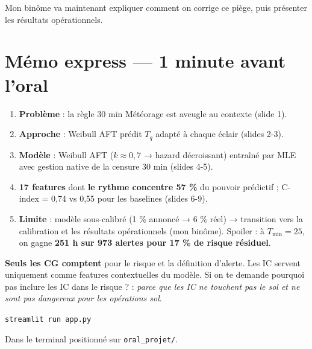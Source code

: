 \documentclass[11pt,a4paper]{article}
\begin{document}
\begin{transit}
\og Mon binôme va maintenant expliquer comment on corrige ce piège, puis présenter les
résultats opérationnels. \fg{}
\end{transit}

\section*{Mémo express — 1 minute avant l'oral}

\begin{tcolorbox}[colback=red!4, colframe=red!50!black, title=\textbf{Les 5 phrases-clés (slides 1-10)}]
\begin{enumerate}
    \item \textbf{Problème} : la règle 30 min Météorage est aveugle au contexte (slide 1).
    \item \textbf{Approche} : Weibull AFT prédit $T_q$ adapté à chaque éclair (slides 2-3).
    \item \textbf{Modèle} : Weibull AFT ($k \approx 0{,}7$ → hazard décroissant) entraîné par
    MLE avec gestion native de la censure 30 min (slides 4-5).
    \item \textbf{17 features} dont \textbf{le rythme concentre 57 \%} du pouvoir prédictif ;
    C-index = 0,74 vs 0,55 pour les baselines (slides 6-9).
    \item \textbf{Limite} : modèle sous-calibré (1 \% annoncé → 6 \% réel) → transition
    vers la calibration et les résultats opérationnels (mon binôme). Spoiler : à $T_{\min}=25$,
    on gagne \textbf{251 h sur 973 alertes pour 17 \% de risque résiduel}.
\end{enumerate}
\end{tcolorbox}

\begin{tcolorbox}[colback=blue!4, colframe=blue!50!black, title=\textbf{Convention essentielle}]
\textbf{Seuls les CG comptent} pour le risque et la définition d'alerte. Les IC servent
uniquement comme features contextuelles du modèle. Si on te demande \og pourquoi pas
inclure les IC dans le risque ? \fg{} : \emph{parce que les IC ne touchent pas le sol et
ne sont pas dangereux pour les opérations sol}.
\end{tcolorbox}

\begin{tcolorbox}[colback=green!4, colframe=green!50!black, title=\textbf{Lancer la démo (binôme)}]
\texttt{streamlit run app.py}

\noindent Dans le terminal positionné sur \texttt{oral\_projet/}.
\end{tcolorbox}
\end{document}
